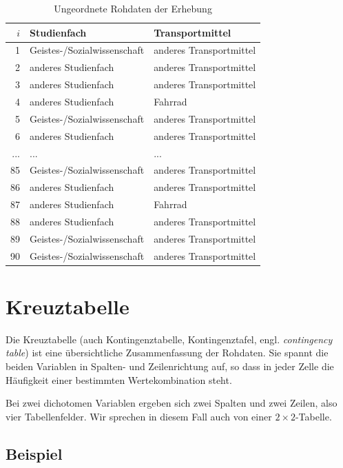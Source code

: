 \documentclass[
  11pt,
  ngerman,
  a4paper,
]{report}
\begin{document}
\begin{table}

\caption{\label{tab:roh}\label{tab:roh}Ungeordnete Rohdaten der Erhebung}
\centering
\begin{tabular}[t]{rll}
\toprule
\textbf{$i$} & \textbf{Studienfach} & \textbf{Transportmittel}\\
\midrule
1 & Geistes-/Sozialwissenschaft & anderes Transportmittel\\
2 & anderes Studienfach & anderes Transportmittel\\
3 & anderes Studienfach & anderes Transportmittel\\
4 & anderes Studienfach & Fahrrad\\
5 & Geistes-/Sozialwissenschaft & anderes Transportmittel\\
6 & anderes Studienfach & anderes Transportmittel\\
... & ... & ...\\
85 & Geistes-/Sozialwissenschaft & anderes Transportmittel\\
86 & anderes Studienfach & anderes Transportmittel\\
87 & anderes Studienfach & Fahrrad\\
88 & anderes Studienfach & anderes Transportmittel\\
89 & Geistes-/Sozialwissenschaft & anderes Transportmittel\\
90 & Geistes-/Sozialwissenschaft & anderes Transportmittel\\
\bottomrule
\end{tabular}
\end{table}

\hypertarget{kreuztabelle}{%
\section{Kreuztabelle}\label{kreuztabelle}}

Die Kreuztabelle (auch Kontingenztabelle, Kontingenztafel, engl. \emph{contingency table}) ist eine übersichtliche Zusammenfassung der Rohdaten. Sie spannt die beiden Variablen in Spalten- und Zeilenrichtung auf, so dass in jeder Zelle die Häufigkeit einer bestimmten Wertekombination steht.

Bei zwei dichotomen Variablen ergeben sich zwei Spalten und zwei Zeilen, also vier Tabellenfelder. Wir sprechen in diesem Fall auch von einer \(2\times2\)-Tabelle.

\hypertarget{beispiel-30}{%
\subsection{Beispiel}\label{beispiel-30}}
\end{document}
